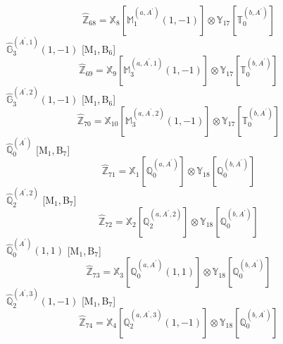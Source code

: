 \documentclass[fleqn,10pt,landscape]{article}
\begin{document}
\begin{itemize}
\begin{dmath*}
\hat{\mathbb{Z}}_{68}=\mathbb{X}_{8}[\mathbb{M}_{1}^{(a,A^{\prime})}(1,-1)] \otimes\mathbb{Y}_{17}[\mathbb{T}_{0}^{(b,A^{\prime})}]
\end{dmath*}
\vspace{4mm}
\noindent {} $\,\,\,\hat{\mathbb{G}}_{3}^{(A^{\prime},1)}(1,-1)$ [M$_{1}$,\,B$_{6}$]
\begin{dmath*}
\hat{\mathbb{Z}}_{69}=\mathbb{X}_{9}[\mathbb{M}_{3}^{(a,A^{\prime},1)}(1,-1)] \otimes\mathbb{Y}_{17}[\mathbb{T}_{0}^{(b,A^{\prime})}]
\end{dmath*}
\vspace{4mm}
\noindent {} $\,\,\,\hat{\mathbb{G}}_{3}^{(A^{\prime},2)}(1,-1)$ [M$_{1}$,\,B$_{6}$]
\begin{dmath*}
\hat{\mathbb{Z}}_{70}=\mathbb{X}_{10}[\mathbb{M}_{3}^{(a,A^{\prime},2)}(1,-1)] \otimes\mathbb{Y}_{17}[\mathbb{T}_{0}^{(b,A^{\prime})}]
\end{dmath*}
\vspace{4mm}
\noindent {} $\,\,\,\hat{\mathbb{Q}}_{0}^{(A^{\prime})}$ [M$_{1}$,\,B$_{7}$]
\begin{dmath*}
\hat{\mathbb{Z}}_{71}=\mathbb{X}_{1}[\mathbb{Q}_{0}^{(a,A^{\prime})}] \otimes\mathbb{Y}_{18}[\mathbb{Q}_{0}^{(b,A^{\prime})}]
\end{dmath*}
\vspace{4mm}
\noindent {} $\,\,\,\hat{\mathbb{Q}}_{2}^{(A^{\prime},2)}$ [M$_{1}$,\,B$_{7}$]
\begin{dmath*}
\hat{\mathbb{Z}}_{72}=\mathbb{X}_{2}[\mathbb{Q}_{2}^{(a,A^{\prime},2)}] \otimes\mathbb{Y}_{18}[\mathbb{Q}_{0}^{(b,A^{\prime})}]
\end{dmath*}
\vspace{4mm}
\noindent {} $\,\,\,\hat{\mathbb{Q}}_{0}^{(A^{\prime})}(1,1)$ [M$_{1}$,\,B$_{7}$]
\begin{dmath*}
\hat{\mathbb{Z}}_{73}=\mathbb{X}_{3}[\mathbb{Q}_{0}^{(a,A^{\prime})}(1,1)] \otimes\mathbb{Y}_{18}[\mathbb{Q}_{0}^{(b,A^{\prime})}]
\end{dmath*}
\vspace{4mm}
\noindent {} $\,\,\,\hat{\mathbb{Q}}_{2}^{(A^{\prime},3)}(1,-1)$ [M$_{1}$,\,B$_{7}$]
\begin{dmath*}
\hat{\mathbb{Z}}_{74}=\mathbb{X}_{4}[\mathbb{Q}_{2}^{(a,A^{\prime},3)}(1,-1)] \otimes\mathbb{Y}_{18}[\mathbb{Q}_{0}^{(b,A^{\prime})}]
\end{dmath*}
\vspace{4mm}

\end{itemize}
\end{document}

